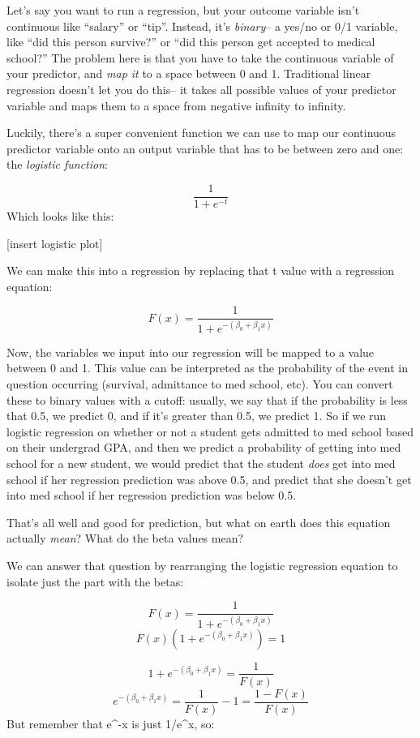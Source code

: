 \documentclass[]{article}
\begin{document}
Let's say you want to run a regression, but your outcome variable isn't
continuous like ``salary'' or ``tip''. Instead, it's \emph{binary}-- a
yes/no or 0/1 variable, like ``did this person survive?'' or ``did this
person get accepted to medical school?'' The problem here is that you
have to take the continuous variable of your predictor, and \emph{map
it} to a space between 0 and 1. Traditional linear regression doesn't
let you do this-- it takes all possible values of your predictor
variable and maps them to a space from negative infinity to infinity.

Luckily, there's a super convenient function we can use to map our
continuous predictor variable onto an output variable that has to be
between zero and one: the \emph{logistic function}:

\[  \frac{1}{1+e^{-t}}\] Which looks like this:

{[}insert logistic plot{]}

We can make this into a regression by replacing that t value with a
regression equation:

\[ F(x) = \frac{1}{1+ e^{-(\beta_0 + \beta_1x)}}  \]

Now, the variables we input into our regression will be mapped to a
value between 0 and 1. This value can be interpreted as the probability
of the event in question occurring (survival, admittance to med school,
etc). You can convert these to binary values with a cutoff: usually, we
say that if the probability is less that 0.5, we predict 0, and if it's
greater than 0.5, we predict 1. So if we run logistic regression on
whether or not a student gets admitted to med school based on their
undergrad GPA, and then we predict a probability of getting into med
school for a new student, we would predict that the student \emph{does}
get into med school if her regression prediction was above 0.5, and
predict that she doesn't get into med school if her regression
prediction was below 0.5.

That's all well and good for prediction, but what on earth does this
equation actually \emph{mean}? What do the beta values mean?

We can answer that question by rearranging the logistic regression
equation to isolate just the part with the betas:

\[ F(x) = \frac{1}{1+ e^{-(\beta_0 + \beta_1x)}}  \]
\[ F(x) (1+ e^{-(\beta_0 + \beta_1x)}) = 1  \]

\[ 1+ e^{-(\beta_0 + \beta_1x)} = \frac{1}{F(x)}  \]
\[ e^{-(\beta_0 + \beta_1x)} = \frac{1}{F(x)} -1 = \frac{1-F(x)}{F(x)}  \]
But remember that e\^{}-x is just 1/e\^{}x, so:
\end{document}
